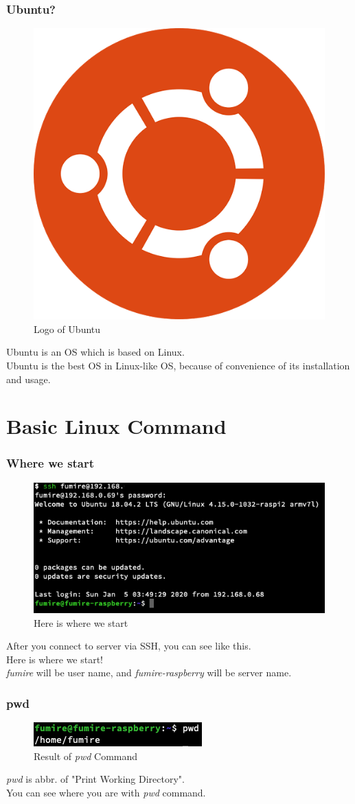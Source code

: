 \documentclass{beamer}
\begin{document}
	\begin{frame}
		\frametitle{Ubuntu?}
		\begin{figure}[h!]
			\centering
			\includegraphics[width=0.3 \linewidth]{figures/ubuntu.jpg}
			\caption{Logo of Ubuntu}
		\end{figure}
		Ubuntu is an OS which is based on Linux. \\
		Ubuntu is the best OS in Linux-like OS, because of convenience of its installation and usage.
	\end{frame}
	
	\section{Basic Linux Command}
	
	\begin{frame}
		\frametitle{Where we start}
		\begin{figure}[h!]
			\centering
			\includegraphics[width=0.5 \linewidth]{figures/1.png}
			\caption{Here is where we start}
		\end{figure}
	
		After you connect to server via SSH, you can see like this. \\
		Here is where we start! \\
		\textit{fumire} will be user name, and \textit{fumire-raspberry} will be server name. 
	\end{frame}

	\begin{frame}
		\frametitle{pwd}
		\begin{figure}[h!]
			\centering
			\includegraphics[width=0.5 \linewidth]{figures/2.png}
			\caption{Result of \textit{pwd} Command}
		\end{figure}
		\textit{pwd} is abbr. of "Print Working Directory". \\
		You can see where you are with \textit{pwd} command.
	\end{frame}
\end{document}
